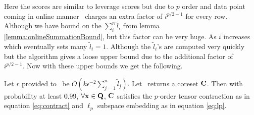 % 
Here the scores are similar to leverage scores \cite{woodruff2014sketching} but due to $p$ order and data point coming in online manner \online~charges an extra factor of $i^{p/2-1}$ for every row. Although we have bound on the $\sum_{i}^{n} \tilde{l}_{i}$ from lemma \ref{lemma:onlineSummationBound}, but this factor can be very huge. As $i$ increases which eventually sets many $\tilde{l}_{i} = 1$. Although the $\tilde{l}_{i}$'s are computed very quickly but the algorithm gives a loose upper bound due to the additional factor of $i^{p/2-1}$. Now with these upper bounds we get the following.
% 
\begin{lemma}{\label{lemma:onlineGuarantee}}
Let $r$ provided to \online~be 
$O(k\epsilon^{-2}\sum_{j=1}^{n}\tilde{l}_{j})$. Let \online~returns a coreset $\mathbf{C}$. Then with probability at least $0.99$, $\forall \mathbf{x} \in \mathbf{Q}$, 
$\mathbf{C}$ satisfies the $p$-order tensor contraction as in equation \eqref{eq:contract} and $\ell_{p}$ subspace embedding as in equation \eqref{eq:lp}.
\end{lemma}
